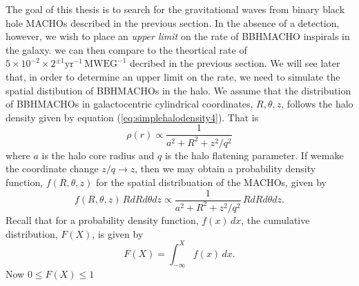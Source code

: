 The goal of this thesis is to search for the gravitational waves from binary
black hole MACHOs described in the previous section. In the absence of a
detection, however, we wish to place an \emph{upper limit} on the rate of
BBHMACHO inspirals in the galaxy. we can then compare to the theortical rate
of $5\times 10^{-2}\times2^{\pm 1} \mathrm{yr}^{-1}\,\mathrm{MWEG}^{-1}$
decribed in the previous section. We will see later that, in order to
determine an upper limit on the rate, we need to simulate the spatial
distibution of BBHMACHOs in the halo. We assume that the distribution of
BBHMACHOs in galactocentric cylindrical coordinates, $R,\theta,z$, follows the
halo density given by equation (\ref{eq:simplehalodensity4}). That is
\begin{equation}
\rho(r) \propto \frac{1}{a^2 + R^2 + z^2/q^2}
\end{equation}
where $a$ is the halo core radius and $q$ is the halo flatening parameter. If
wemake the coordinate change $z/q \rightarrow z$, then we may obtain a
probability density function, $f(R,\theta,z)$ for the spatial distribuation of
the MACHOs, given by
\begin{equation}
f(R,\theta,z)\,R dR d\theta dz \propto \frac{1}{a^2 + R^2 + z^2/q^2}\,R dR d\theta dz.
\end{equation}
Recall that for a probability density function, $f(x)\,dx$, the cumulative
distribution, $F(X)$, is given by
\begin{equation}
F(X) = \int_{-\infty}^X f(x)\, dx.
\end{equation}
Now $0 \le F(X) \le 1$


